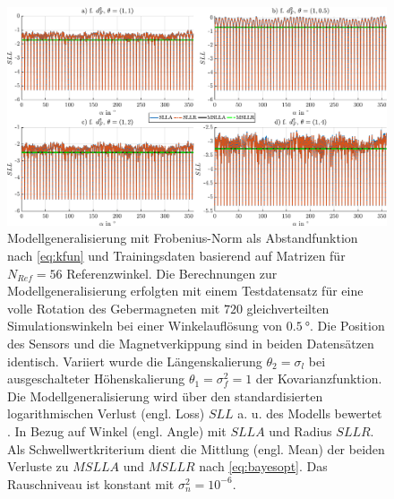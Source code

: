 \clearpage
\begin{figure}[tph]
\centering
\includegraphics[width=\linewidth]{chapters/images/4-EuOExp/Vergleich-QFC-SLL}
\caption[Modellgeneralisierung mit Frobenius-Norm als Abstandfunktion]{Modellgeneralisierung mit Frobenius-Norm als Abstandfunktion nach \autoref{eq:kfun} und Trainingsdaten basierend auf Matrizen für $N_{Ref} = 56$ Referenzwinkel. Die Berechnungen zur Modellgeneralisierung erfolgten mit einem Testdatensatz für eine volle Rotation des Gebermagneten mit $720$ gleichverteilten Simulationswinkeln bei einer Winkelauflösung von $\SI{0,5}{\degree}$. Die Position des Sensors und die Magnetverkippung sind in beiden Datensätzen identisch. Variiert wurde die Längenskalierung $\theta_2 = \sigma_l$ bei ausgeschalteter Höhenskalierung $\theta_1 = \sigma_f^2 = 1$ der Kovarianzfunktion. Die Modellgeneralisierung wird über den standardisierten logarithmischen Verlust (engl. Loss) $SLL$ a. u. des Modells bewertet \cite{Rasmussen2006}. In Bezug auf Winkel (engl. Angle) mit $SLLA$ und Radius $SLLR$. Als Schwellwertkriterium dient die Mittlung (engl. Mean) der beiden Verluste zu $MSLLA$ und $MSLLR$ nach \autoref{eq:bayesopt}. Das Rauschniveau ist konstant mit $\sigma_n^2 = 10^{-6}$.}
\label{fig:vergleich-qfc-sll}
\end{figure}


